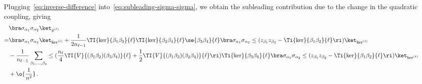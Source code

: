 Plugging~\eqref{eq:inverse-difference} into~\eqref{eq:subleading-sigma-sigma}, we obtain the subleading contribution due to the change in the quadratic coupling, giving
\begin{align}\label{eq:subleading-sigma-sigma-more-explicit}
&\bra \sigma_{\alpha_1}\sigma_{\alpha_2}\ket_{g^{(\ell)}}\, \\
=&\bra \sigma_{\alpha_1}\sigma_{\alpha_2}\ket_{\ker^{(\ell)}}+\frac{1}{2n_{\ell-1}}\TI{\ker}{\beta_1\beta_3}{\ell}\TI{\ker}{\beta_2\beta_4}{\ell}\se{\beta_3\beta_4}{\ell}\bra \sigma_{\alpha_1}\sigma_{\alpha_2} \le(z_{\beta_1}z_{\beta_2}-\Ti{\ker}{\beta_1\beta_2}{\ell}\ri)\ket_{\ker^{(\ell)}}\, \nonumber\\
&-\frac{1}{n_{\ell-1}}\sum_{\beta_1,\ldots,\beta_4}\le(\frac{n_{\ell}}{4} \TI{V}{(\beta_1\beta_2)(\beta_3\beta_4)}{\ell}+\frac{1}{2}\TI{V}{(\beta_1\beta_3)(\beta_2\beta_4)}{\ell}\ri)\Ti{\ker}{\beta_3\beta_4}{\ell}\bra \sigma_{\alpha_1}\sigma_{\alpha_2} \le(z_{\beta_1}z_{\beta_2}-\Ti{\ker}{\beta_1\beta_2}{\ell}\ri)\ket_{\ker^{(\ell)}}\, \nonumber\\
&+\o{\frac{1}{n^2}}\, .\nonumber
\end{align}

